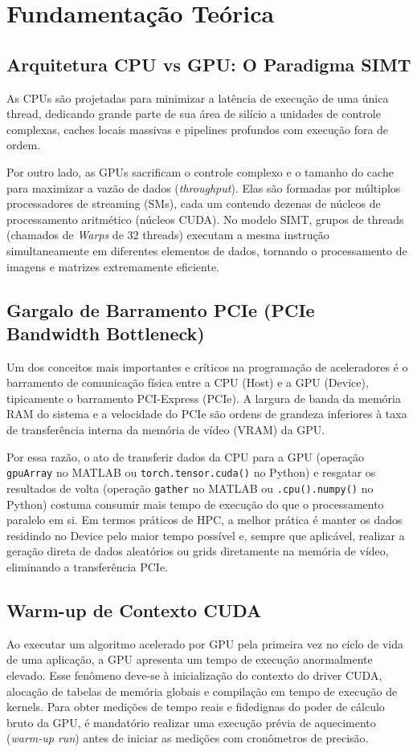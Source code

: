 \documentclass[12pt,a4paper]{article}
\begin{document}
\section{Fundamentação Teórica}

\subsection{Arquitetura CPU vs GPU: O Paradigma SIMT}
As CPUs são projetadas para minimizar a latência de execução de uma única thread, dedicando grande parte de sua área de silício a unidades de controle complexas, caches locais massivas e pipelines profundos com execução fora de ordem. 

Por outro lado, as GPUs sacrificam o controle complexo e o tamanho do cache para maximizar a vazão de dados (\textit{throughput}). Elas são formadas por múltiplos processadores de streaming (SMs), cada um contendo dezenas de núcleos de processamento aritmético (núcleos CUDA). No modelo SIMT, grupos de threads (chamados de \textit{Warps} de 32 threads) executam a mesma instrução simultaneamente em diferentes elementos de dados, tornando o processamento de imagens e matrizes extremamente eficiente.

\subsection{Gargalo de Barramento PCIe (PCIe Bandwidth Bottleneck)}
Um dos conceitos mais importantes e críticos na programação de aceleradores é o barramento de comunicação física entre a CPU (Host) e a GPU (Device), tipicamente o barramento PCI-Express (PCIe). A largura de banda da memória RAM do sistema e a velocidade do PCIe são ordens de grandeza inferiores à taxa de transferência interna da memória de vídeo (VRAM) da GPU. 

Por essa razão, o ato de transferir dados da CPU para a GPU (operação \texttt{gpuArray} no MATLAB ou \texttt{torch.tensor.cuda()} no Python) e resgatar os resultados de volta (operação \texttt{gather} no MATLAB ou \texttt{.cpu().numpy()} no Python) costuma consumir mais tempo de execução do que o processamento paralelo em si. Em termos práticos de HPC, a melhor prática é manter os dados residindo no Device pelo maior tempo possível e, sempre que aplicável, realizar a geração direta de dados aleatórios ou grids diretamente na memória de vídeo, eliminando a transferência PCIe.

\subsection{Warm-up de Contexto CUDA}
Ao executar um algoritmo acelerado por GPU pela primeira vez no ciclo de vida de uma aplicação, a GPU apresenta um tempo de execução anormalmente elevado. Esse fenômeno deve-se à inicialização do contexto do driver CUDA, alocação de tabelas de memória globais e compilação em tempo de execução de kernels. Para obter medições de tempo reais e fidedignas do poder de cálculo bruto da GPU, é mandatório realizar uma execução prévia de aquecimento (\textit{warm-up run}) antes de iniciar as medições com cronômetros de precisão.
\end{document}
